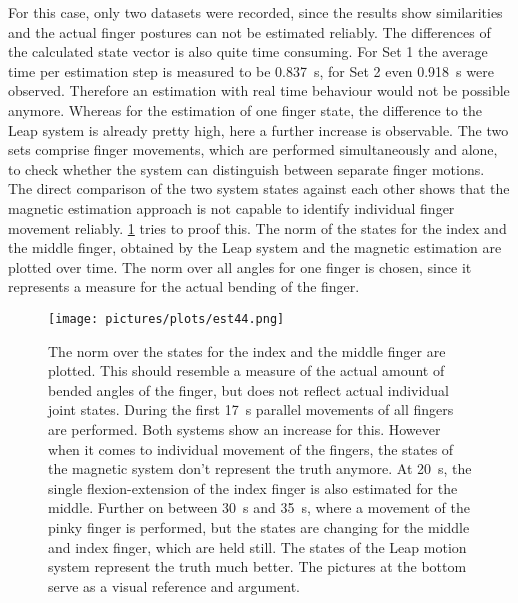 For this case, only two datasets were recorded, since the results show similarities and the actual finger postures can not be estimated reliably. The differences of the calculated state vector is also quite time consuming. For Set 1 the average time per estimation step is measured to be \SI{0.837}{\second}, for Set 2 even \SI{0.918}{\second} were observed. Therefore an estimation with real time behaviour would not be possible anymore. Whereas for the estimation of one finger state, the difference to the Leap system is already pretty high, here a further increase is observable. The two sets comprise finger movements, which are performed simultaneously and alone, to check whether the system can distinguish between separate finger motions. The direct comparison of the two system states against each other shows that the magnetic estimation approach is not capable to identify individual finger movement reliably. \ref{fig:est44} tries to proof this. The norm of the states for the index and the middle finger, obtained by the Leap system and the magnetic estimation are plotted over time. The norm over all angles for one finger is chosen, since it represents a measure for the actual bending of the finger. 
\begin{figure}
\centering
\texttt{[image: pictures/plots/est44.png]}
\caption[Estimating the motion of four fingers]
{The norm over the states for the index and the middle finger are plotted. This should resemble a measure of the actual amount of bended angles of the finger, but does not reflect actual individual joint states. During the first \SI{17}{\second} parallel movements of all fingers are performed. Both systems show an increase for this. However when it comes to individual movement of the fingers, the states of the magnetic system don't represent the truth anymore. At \SI{20}{\second}, the single flexion-extension of the index finger is also estimated for the middle. Further on between \SI{30}{\second} and \SI{35}{\second}, where a movement of the pinky finger is performed, but the states are changing for the middle and index finger, which are held still. The states of the Leap motion system represent the truth much better. The pictures at the bottom serve as a visual reference and argument. }
\label{fig:est44}
\end{figure}
